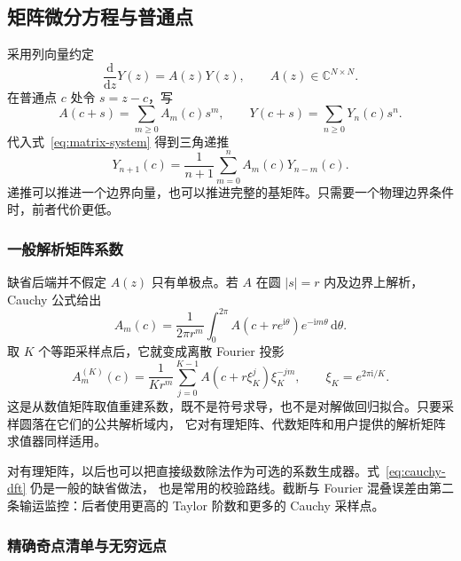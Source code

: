 \documentclass[11pt,a4paper]{ctexart}
\newcommand{\dd}{\mathrm d}
\renewcommand{\_}{\origunderscore\allowbreak}
\begin{document}
\subsection{矩阵微分方程与普通点}
\label{subsec:ordinary}

采用列向量约定
\begin{equation}
  \frac{\dd}{\dd z}Y(z)=A(z)Y(z),
  \qquad A(z)\in\mathbb C^{N\times N}.
  \label{eq:matrix-system}
\end{equation}
在普通点 $c$ 处令 $s=z-c$，写
\begin{equation}
  A(c+s)=\sum_{m\geq0}A_m(c)s^m,
  \qquad
  Y(c+s)=\sum_{n\geq0}Y_n(c)s^n.
\end{equation}
代入式~\eqref{eq:matrix-system} 得到三角递推
\begin{equation}
  Y_{n+1}(c)=\frac{1}{n+1}\sum_{m=0}^{n}A_m(c)Y_{n-m}(c).
  \label{eq:ordinary-recurrence}
\end{equation}
递推可以推进一个边界向量，也可以推进完整的基矩阵。只需要一个物理边界条件时，前者代价更低。

\subsubsection{一般解析矩阵系数}

缺省后端并不假定 $A(z)$ 只有单极点。若 $A$ 在圆 $|s|=r$ 内及边界上解析，Cauchy 公式给出
\begin{equation}
  A_m(c)=\frac{1}{2\pi r^m}\int_0^{2\pi}
  A(c+r e^{\mathrm i\theta})e^{-\mathrm i m\theta}\,\dd\theta.
\end{equation}
取 $K$ 个等距采样点后，它就变成离散 Fourier 投影
\begin{equation}
  A_m^{(K)}(c)=\frac{1}{K r^m}\sum_{j=0}^{K-1}
  A(c+r\xi_K^j)\xi_K^{-jm},
  \qquad \xi_K=e^{2\pi\mathrm i/K}.
  \label{eq:cauchy-dft}
\end{equation}
这是从数值矩阵取值重建系数，既不是符号求导，也不是对解做回归拟合。只要采样圆落在它们的公共解析域内，
它对有理矩阵、代数矩阵和用户提供的解析矩阵求值器同样适用。

对有理矩阵，以后也可以把直接级数除法作为可选的系数生成器。式~\eqref{eq:cauchy-dft} 仍是一般的缺省做法，
也是常用的校验路线。截断与 Fourier 混叠误差由第二条输运监控：后者使用更高的 Taylor 阶数和更多的 Cauchy
采样点。

\subsubsection{精确奇点清单与无穷远点}
\label{subsec:singularity-inventory}
\end{document}
